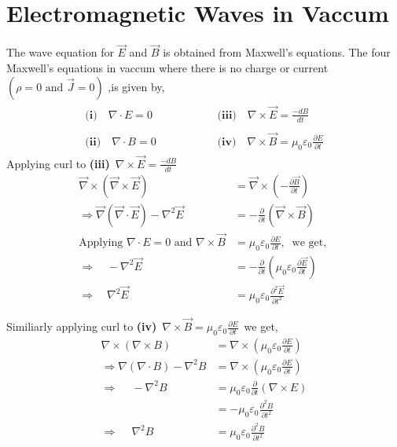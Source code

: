 \section{Electromagnetic Waves in Vaccum}
The wave equation for $\vec{E}$ and $\vec{B}$ is obtained from  Maxwell's equations. The four Maxwell's equations in vaccum  where there is no charge or current \ $(\rho=0 \text { and } \vec{J}=0)$ ,is given by,
\begin{align*}
\begin{array}{lll}
\textbf{(i)}\quad \nabla\cdot E=0&\hspace{2cm}\textbf{(iii)}\quad \nabla\times\vec{E}=\frac{-dB}{dt}\\\\
\textbf{(ii)}\quad \nabla\cdot B=0&\hspace{2cm}\textbf{(iv)} \quad \nabla\times\vec{B}=\mu_{0}\varepsilon_0\frac{\partial E}{\partial t}
\end{array}
\end{align*}
Applying curl to \textbf{(iii)}\ $\nabla\times\vec{E}=\frac{-dB}{dt}$
\begin{align*}
\vec{\nabla} \times(\vec{\nabla} \times \vec{E})&=\vec{\nabla} \times\left(-\frac{\partial \vec{B}}{\partial t}\right)\\ 
\Rightarrow \vec{\nabla}(\vec{\nabla} \cdot \vec{E})-\nabla^{2} \vec{E}&=-\frac{\partial}{\partial t}(\vec{\nabla} \times \vec{B})\\
\text{Applying  \ $\nabla\cdot E=0$ \ and \ $\nabla\times\vec{B}$}&=\mu_{0}\varepsilon_0\frac{\partial E}{\partial t} , \ \text{ we get, }\\
\Rightarrow \quad-\nabla^{2} \vec{E}&=-\frac{\partial}{\partial t}\left(\mu_{0} \varepsilon_{0} \frac{\partial \vec{E}}{\partial t}\right)\\
\Rightarrow \quad \nabla^{2} \vec{E}&=\mu_{0} \varepsilon_{0} \frac{\partial^{2} \vec{E}}{\partial t^{2}} 
\end{align*}
\begin{center}
\end{center}
Similiarly applying curl to \textbf{(iv)}\ $\nabla\times\vec{B}=\mu_{0}\varepsilon_0\frac{\partial E}{\partial t}$\ we get, 
\begin{align*}
\nabla\times(\nabla\times B)&= \nabla\times(\mu_{0}\varepsilon_0\frac{\partial E}{\partial t}) \\
\Rightarrow  \nabla(\nabla\cdot B)-\nabla^2B &=\nabla\times(\mu_{0}\varepsilon_0\frac{\partial E}{\partial t})\\
\Rightarrow \quad \ -\nabla^2B &=\mu_{0}\varepsilon_0\frac{\partial}{\partial t}(\nabla\times E)\\
&=-\mu_{0}\varepsilon_0\frac{\partial ^2B}{\partial t^2}\\
\Rightarrow \quad \ \nabla^2 B&= \mu_{0}\varepsilon_0\frac{\partial^2B}{\partial t^2}
\end{align*}
